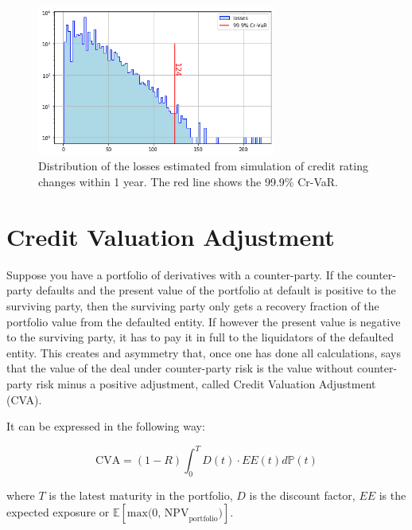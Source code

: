 \begin{figure}[htb]
	\centering
	\includegraphics[width=0.7\textwidth]{figures/credit_metrics.png}
	\caption{Distribution of the losses estimated from simulation of credit rating changes within 1 year. The red line shows the 99.9\% Cr-VaR.}
\end{figure}

\section{Credit Valuation
Adjustment}\label{credit-valuation-adjustment}

Suppose you have a portfolio of derivatives with a counter-party. 
If the counter-party defaults and the present value of the portfolio at
default is positive to the surviving party, then the surviving party only
gets a recovery fraction of the portfolio value from the defaulted entity. If however the present value is negative to the surviving party,
it has to pay it in full to the liquidators of the defaulted entity. This creates and asymmetry that, once one has done all
calculations, says that the value of the deal under counter-party risk is
the value without counter-party risk minus a positive adjustment, called
Credit Valuation Adjustment (CVA).


It can be expressed in the following way:

\begin{equation}
\text{CVA} = (1-R) \int_0^T D(t) \cdot EE(t) d\mathbb{P}(t)
\label{eq:cva}
\end{equation}

where \(T\) is the latest maturity in the portfolio, \(D\) is the
discount factor, \(EE\) is the expected exposure or
\(\mathbb{E}[\text{max(0, NPV}_\text{portfolio})]\).


